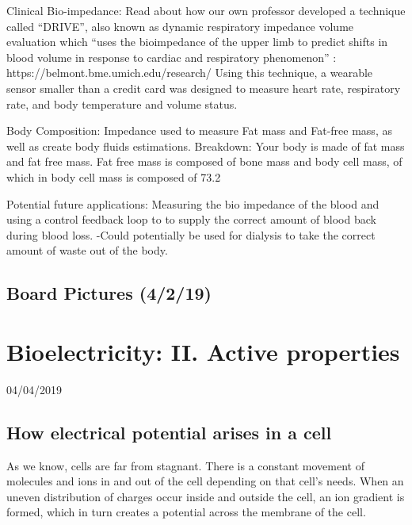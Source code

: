 \documentclass[11pt]{book}
\begin{document}
Clinical Bio-impedance: Read about how our own professor developed a technique called “DRIVE”, also known as dynamic respiratory impedance volume evaluation which “uses the bioimpedance of the upper limb to predict shifts in blood volume in response to cardiac and respiratory phenomenon” : https://belmont.bme.umich.edu/research/ 
Using this technique, a wearable sensor smaller than a credit card was designed to measure heart rate, respiratory rate, and body temperature and volume status. 

Body Composition: Impedance used to measure Fat mass and Fat-free mass, as well as create body fluids estimations. 
Breakdown: Your body is made of fat mass and fat free mass. Fat free mass is composed of bone mass and body cell mass, of which in body cell mass is composed of 73.2%

Potential future applications: Measuring the bio impedance of the blood and using a control feedback loop to to supply the correct amount of blood back during blood loss. 
-Could potentially be used for dialysis to take the correct amount of waste out of the body.

\section{Board Pictures (4/2/19)}


\chapter{Bioelectricity: II. Active properties}
04/04/2019
\minitoc
\newpage

\section{How electrical potential arises in a cell}
As we know, cells are far from stagnant. There is a constant movement of molecules and ions in and out of the cell depending on that cell's needs. When an uneven distribution of charges occur inside and outside the cell, an ion gradient is formed, which in turn creates a potential across the membrane of the cell. 
\end{document}
